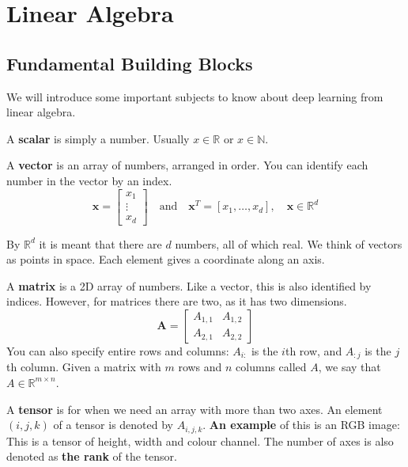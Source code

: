 \chapter{Linear Algebra}

\section{Fundamental Building Blocks}%
\label{subsec:label}

We will introduce some important subjects to know about deep learning from linear algebra.

A \textbf{scalar} is simply a number. Usually \(x \in \mathbb{R}\) or \(x \in \mathbb{N}\).

A \textbf{vector} is an array of numbers, arranged in order. You can identify each number in the vector by an index.
\begin{equation*}
	\mathbf{x} = \begin{bmatrix} x_1 \\ \vdots \\ x_d \end{bmatrix}
	\quad \text{and} \quad
	\mathbf{x}^T = [x_1, \dots, x_d], \quad \mathbf{x} \in \mathbb{R}^d
\end{equation*}

By $\mathbb{R}^{d}$ it is meant that there are $d$ numbers, all of which real.
We think of vectors as points in space. Each element gives a coordinate along an axis.

A \textbf{matrix} is a 2D array of numbers. Like a vector, this is also identified by indices. However, for matrices there are two, as it has two dimensions.
\begin{equation*}
	\mathbf{A} = \begin{bmatrix} A_{1,1} & A_{1,2} \\ A_{2,1} & A_{2,2} \end{bmatrix}
\end{equation*}
You can also specify entire rows and columns: $A_{i:}$ is the $i$th row, and $A_{:j}$ is the $j$th column. Given a matrix with $m$ rows and $n$ columns called $A$, we say that $A \in \mathbb{R}^{m \times n}$.

A \textbf{tensor} is for when we need an array with more than two axes. An element $(i,j,k)$ of a tensor is denoted by $A_{i,j,k}$. \textbf{An example} of this is an RGB image: This is a tensor of height, width and colour channel. The number of axes is also denoted as \textbf{the rank} of the tensor.

